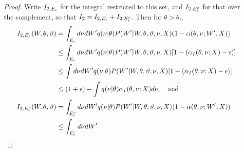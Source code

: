 \begin{proof}
{  Write $I_{2,E_{\epsilon}}$ for the integral restricted to this set, and
  $I_{2,E_{\epsilon}^c}$ for that over the complement, so that
 $I_{2}= I_{2,E_{\epsilon}}+I_{2,E_{\epsilon}^c}$.
 Then for $\theta > \theta_\epsilon$,
}
\begin{align*}
I_{2,\E_{\epsilon}}(W, \theta, \vartheta) &= \int_{\E_{\epsilon}} d\ptheta  dW'q(\ptheta | \theta)P(W' | W, \theta, \vartheta, \ptheta, X)(1 - \alpha(\theta, \ptheta ; W', X)) \\
&\le \int_{\E_\epsilon}d\ptheta dW' q(\ptheta | \theta)
  P(W' | W, \theta, \vartheta, \ptheta, X)  [ 1 - (\alpha_I(\theta, \ptheta ; X)-\epsilon)] \\
&\le   \int d\ptheta dW'  q(\ptheta | \theta)
  P(W' | W, \theta, \vartheta, \ptheta, X)
  [ 1 - (\alpha_I(\theta, \ptheta ; X)-\epsilon)] \\
  &\le (1+\epsilon)  - \int  q(\ptheta | \theta) \alpha_I(\theta, \ptheta ; X) d\ptheta, \quad \text{and}  \\
  I_{2,\E_{\epsilon}^c}(W, \theta, \vartheta)  &= \int_{\E^c_{\epsilon}} d\ptheta  dW'q(\ptheta | \theta)P(W' | W, \theta, \vartheta, \ptheta, X)(1 - \alpha(\theta, \ptheta ; W', X)) \\
  &\le \int_{\E^c_{\epsilon}} d\ptheta dW'

\end{align*}
\end{proof}
